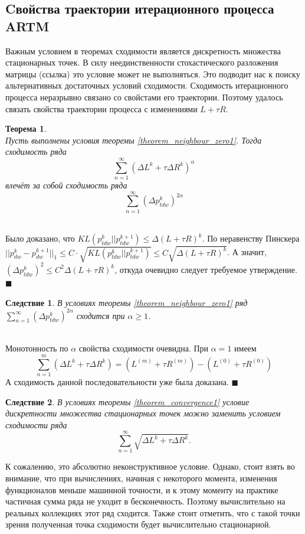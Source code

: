 \documentclass[12pt]{article}
\newtheorem{theorem}{Теорема}
\newtheorem{conseq}{Следствие}[theorem]
\newenvironment{Proof} 
	{\par\noindent{\bf Доказательство.}} 
	{\hfill$\blacksquare$}
\renewcommand{\leq}{\leqslant}
\renewcommand{\geq}{\geqslant}
\begin{document}
	\subsection{Cвойства траектории итерационного процесса ARTM}
Важным условием в теоремах сходимости является дискретность множества стационарных точек. В силу неединственности стохастического разложения матрицы (ссылка) это условие может не выполняться. Это подводит нас к поиску альтернативных достаточных условий сходимости. Сходимость итерационного процесса неразрывно связано со свойстами его траектории. Поэтому удалось связать свойства траектории процесса с изменениями $L + \tau R$.
\begin{theorem} \label{theorem_series}\ \\
	Пусть выполнены условия теоремы \ref{theorem_neighbour_zero1}. Тогда сходимость ряда
	\[
		\sum\limits_{n=1}^{\infty} (\Delta L^{k} + \tau \Delta R^{k})^{\alpha}
	\]
	влечёт за собой сходимость ряда
	\[
		\sum\limits_{n=1}^{\infty} (\Delta p_{tdw}^{k})^{2 \alpha}
	\]
\end{theorem}
\begin{Proof}\ \\
Было доказано, что $KL(p_{tdw}^{k}||p_{tdw}^{k+1}) \leq \Delta (L + \tau R)^{k}$. По неравенству Пинскера $|| p_{dw}^{k} - p_{dw}^{k+1}||_1 \leq C \cdot \sqrt{KL(p_{tdw}^{k}||p_{tdw}^{k+1})} \leq C \sqrt{\Delta (L + \tau R)^{k}}$. А значит, $ (\Delta p_{tdw}^{k})^{2} \leq C^2 \Delta (L + \tau R)^{k} $, откуда очевидно следует требуемое утверждение.
\end{Proof}\ \\
\begin{conseq}
В условиях теоремы  \ref{theorem_neighbour_zero1} ряд  $\sum\limits_{n=1}^{\infty} (\Delta p_{tdw}^{k})^{2 \alpha}$ сходится при $\alpha \geq 1$.
\end{conseq}
\begin{Proof}\ \\
Монотонность по $\alpha$ свойства сходимости очевидна. При $\alpha=1$ имеем
\[
\sum\limits_{n=1}^{m} (\Delta L^{k} + \tau \Delta R^{k}) = ( L^{(m)} + \tau R^{(m)}) - ( L^{(0)} + \tau R^{(0)})
\]
А сходимость данной последовательности уже была доказана.
\end{Proof}\ \\
\begin{conseq}
В условиях теоремы  \ref{theorem_convergence1} условие дискретности множества стационарных точек можно заменить условием сходимости ряда
\[
\sum\limits_{n=1}^{\infty} \sqrt{\Delta L^{k} + \tau \Delta R^{k}}.
\]
\end{conseq}
К сожалению, это абсолютно неконструктивное условие. Однако, стоит взять во внимание, что при вычислениях, начиная с некоторого момента, изменения функционалов меньше машинной точности, и к этому моменту на практике частичная сумма ряда не уходит в бесконечность. Поэтому вычислительно на реальных коллекциях этот ряд сходится. Также стоит отметить, что с такой точки зрения полученная точка  сходимости будет вычислительно стационарной.
\end{document}
